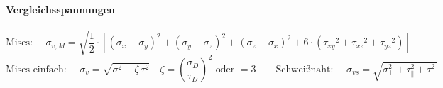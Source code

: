 	
\paragraph{ Vergleichsspannungen}
	\[ 
		\text{Mises: } \quad 
		\sigma_{v,M} = \sqrt{\dfrac{1}{2} \cdot \left[\left(\sigma_x-\sigma_y\right)^2+\left(\sigma_y-\sigma_z\right)^2+\left(\sigma_z-\sigma_x\right)^2+6\cdot\left({\tau_{xy}}^2+{\tau_{xz}}^2+{\tau_{yz}}^2\right)\right]}
	\]
	\[ 
	\text{Mises einfach: } \quad \sigma_v = \sqrt{\sigma^2 + \zeta\ \tau^2} \quad \zeta = \left(\dfrac{\sigma_D}{\tau_D}\right)^2 \text{ oder } = 3
	\qquad
	\text{Schweißnaht: }\quad \sigma_{vs} = \sqrt{\sigma_\perp^2 + \tau_\parallel^2 + \tau_\perp^2}
	\]

